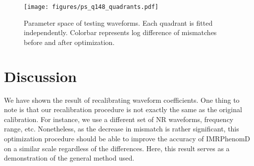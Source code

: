 \documentclass[twocolumn]{aastex631}
\begin{document}
\begin{figure}[t]
	\centering
	\texttt{[image: figures/ps\_q148\_quadrants.pdf]}
	\caption{Parameter space of testing waveforms. Each quadrant is fitted independently. Colorbar represents log difference of mismatches before and after optimization.}
	\label{fig:ps_q148_quadrant}
\end{figure}

\section{Discussion} \label{sec:discussion}


We have shown the result of recalibrating waveform coefficients. One thing to
note is that our recalibration procedure is not exactly the same as the original
calibration. For instance, we use a different set of NR waveforms, frequency
range, etc. Nonetheless, as the decrease in mismatch is rather significant, this
optimization procedure should be able to improve the accuracy of IMRPhenomD on a
similar scale regardless of the differences. Here, this result serves as a
demonstration of the general method used.  
\end{document}
